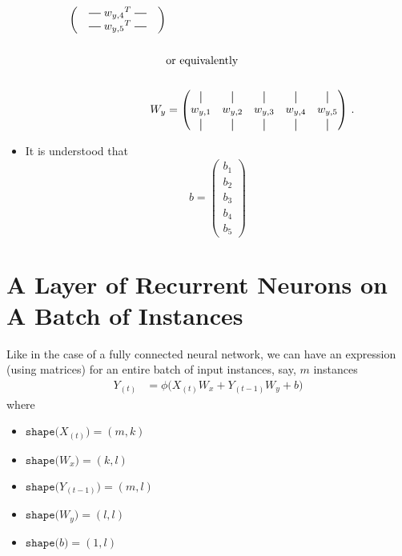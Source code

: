 \documentclass{article}
\newcommand*{\vertbar}{\rule[-1ex]{0.5pt}{2.5ex}}
\newcommand*{\horzbar}{\rule[.5ex]{2.5ex}{0.5pt}}
\begin{document}
\begin{itemize}
\begin{align*}
\begin{pmatrix}
        \quad\horzbar\;{w_{y,4}}^T{}\;\horzbar\quad \\
        \quad\horzbar\;{w_{y,5}}^T{}\;\horzbar\quad \\
      \end{pmatrix} \\
      \\
      \qquad &{}\text{or equivalently} \\
      \\
      {W_y} &= \begin{pmatrix}
        \vertbar & \vertbar & \vertbar & \vertbar & \vertbar \\
        w_{y,1} & w_{y,2} & w_{y,3} & w_{y,4} & w_{y,5} \\
        \vertbar & \vertbar & \vertbar & \vertbar & \vertbar
      \end{pmatrix}\,.
    \end{align*}
  \item It is understood that
    $$
    b =
    \begin{pmatrix}
      b_1 \\
      b_2 \\
      b_3 \\
      b_4 \\
      b_5
    \end{pmatrix}
    $$
\end{itemize}


\section{A Layer of Recurrent Neurons on A Batch of Instances}
Like in the case of a fully connected neural network, we can have an expression (using matrices) for
an entire batch of input instances, say, $m$ instances
\begin{align*}
  Y_{(t)} &= \phi\bigg(
    X_{(t)} W_x
    + Y_{(t-1)} W_y
    + b
  \bigg)
\end{align*}
where
\begin{itemize}
  \item $\texttt{shape(} X_{(t)}\texttt{)}= (m, k)$
  \item $\texttt{shape(} W_{x}\texttt{)}= (k, l)$
  \item $\texttt{shape(} Y_{(t-1)}\texttt{)}= (m, l)$
  \item $\texttt{shape(} W_{y}\texttt{)}= (l, l)$
  \item $\texttt{shape(} b\texttt{)}= (1, l)$
\end{itemize}
\end{document}
